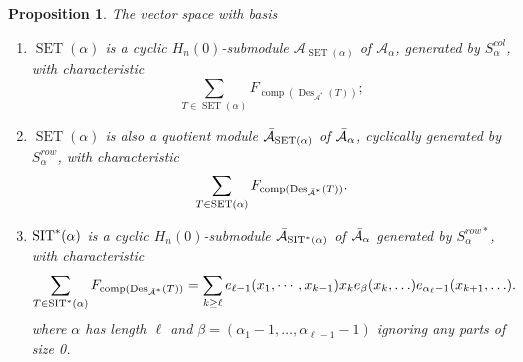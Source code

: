 \documentclass[12pt,letterpaper]{amsart}
\newtheorem{proposition}[theorem]{Proposition}
\theoremstyle{definition}
\DeclareMathOperator{\comp}{comp}
\DeclareMathOperator{\Des}{Des}
\newcommand{\SET}{\ensuremath{\operatorname{SET}}} \newcommand{\NSET}{\ensuremath{\operatorname{NSET}}}\newcommand{\SRCT}{\ensuremath{\operatorname{SRCT}}}
\newcommand{\hn}{H_n(0)}
\begin{document}
\begin{proposition}\label{prop:Z-A-X-barA} The vector space with basis 
\begin{enumerate}\item
 $\SET(\alpha)$ is a cyclic $\hn$-submodule $\mathcal{A}_{\SET(\alpha)}$ of $\mathcal{A}_\alpha$, generated by $S^{col}_\alpha$, with characteristic 
 \[\sum_{T\in \SET(\alpha)}F_{\comp(\Des_{\mathcal{A}^*}(T))};\]
\item $ \SET(\alpha)$ is also a quotient module $\bA_{\SET(\alpha)}$ of $\operatorname{\bar{\mathcal{A}}}_\alpha$,   cyclically generated by $S^{row}_\alpha$, with characteristic
 \[\sum_{T\in \SET(\alpha)}F_{\comp(\Des_{\mathcal{\bA}^*}(T))}.\]
\item  $\operatorname{SIT}^*(\alpha)$ is a cyclic $\hn$-submodule $\operatorname{\bar{\mathcal{A}}}_{\operatorname{SIT}^*(\alpha)}$ of $\operatorname{\bar{\mathcal{A}}}_\alpha$ generated by $S^{row*}_\alpha$, with characteristic 
\[\sum_{T\in \SIT^*(\alpha)}F_{\comp(\Des_{\bA^*}(T))} = \sum_{k\geq \ell} e_{\ell-1}(x_1,\cdots,x_{k-1})x_k e_\beta(x_k,\ldots)e_{\alpha_\ell - 1}(x_{k+1},\ldots).\]
where $\alpha$ has length $\ell$ and $\beta = (\alpha_1-1,\ldots,\alpha_{\ell-1}-1)$ ignoring any parts of size 0.
\end{enumerate}
\end{proposition}
\end{document}

